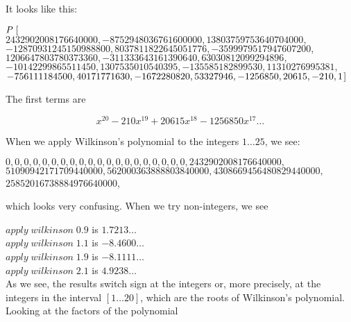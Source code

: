 \documentclass[tikz]{scrreprt}
\newcommand{\Conid}[1]{\mathit{#1}}
\newcommand{\Varid}[1]{\mathit{#1}}
\begin{document}
It looks like this:

\ensuremath{\Conid{P}\;[\mskip1.5mu }\\
\ensuremath{\mathrm{2432902008176640000},\mathbin{-}\mathrm{8752948036761600000},\mathrm{13803759753640704000},}\\
\ensuremath{\mathbin{-}\mathrm{12870931245150988800},\mathrm{8037811822645051776},\mathbin{-}\mathrm{3599979517947607200},}\\
\ensuremath{\mathrm{1206647803780373360},\mathbin{-}\mathrm{311333643161390640},\mathrm{63030812099294896},}\\
\ensuremath{\mathbin{-}\mathrm{10142299865511450},\mathrm{1307535010540395},\mathbin{-}\mathrm{135585182899530},\mathrm{11310276995381},}\\
\ensuremath{\mathbin{-}\mathrm{756111184500},\mathrm{40171771630},\mathbin{-}\mathrm{1672280820},\mathrm{53327946},\mathbin{-}\mathrm{1256850},\mathrm{20615},\mathbin{-}\mathrm{210},\mathrm{1}\mskip1.5mu]}

The first terms are

\[
x^{20} - 210x^{19} + 20615x^{18} - 1256850x^{17} \dots
\]

When we apply Wilkinson's polynomial to the integers $1\dots 25$, we see:

\ensuremath{\mathrm{0},\mathrm{0},\mathrm{0},\mathrm{0},\mathrm{0},\mathrm{0},\mathrm{0},\mathrm{0},\mathrm{0},\mathrm{0},\mathrm{0},\mathrm{0},\mathrm{0},\mathrm{0},\mathrm{0},\mathrm{0},\mathrm{0},\mathrm{0},\mathrm{0},\mathrm{0},\mathrm{2432902008176640000},}\\
\ensuremath{\mathrm{51090942171709440000},\mathrm{562000363888803840000},\mathrm{4308669456480829440000},}\\
\ensuremath{\mathrm{25852016738884976640000}},

which looks very confusing. When we try non-integers, we see

\ensuremath{\Varid{apply}\;\Varid{wilkinson}\;\mathrm{0.9}} is $1.7213\dots$\\
\ensuremath{\Varid{apply}\;\Varid{wilkinson}\;\mathrm{1.1}} is $-8.4600\dots$\\
\ensuremath{\Varid{apply}\;\Varid{wilkinson}\;\mathrm{1.9}} is $-8.1111\dots$\\
\ensuremath{\Varid{apply}\;\Varid{wilkinson}\;\mathrm{2.1}} is $4.9238\dots$\\

As we see, the results switch sign at the integers or,
more precisely, at the integers in the interval $[1\dots 20]$,
which are the roots of Wilkinson's polynomial.
Looking at the factors of the polynomial
\end{document}
